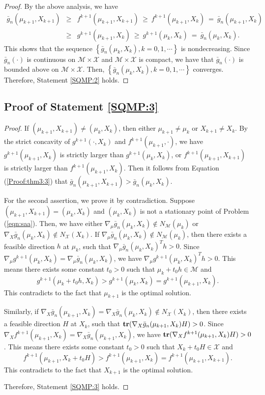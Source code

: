 \begin{proof}
By the above analysis, we have
\begin{eqnarray}\label{Proof:thm3:3}
\bar g_n(\mu_{k+1},X_{k+1}) &\ge& f^{k+1}(\mu_{k+1},X_{k+1})\ \ge\
f^{k+1}(\mu_{k+1},X_{k})\ =\ \bar g_n(\mu_{k+1},X_{k})\nonumber\\
&\ge& g^{k+1}(\mu_{k+1},X_{k})\ \ge\ g^{k+1}(\mu_{k},X_{k})\ =\ \bar
g_n(\mu_{k},X_{k}).
\end{eqnarray}
This shows that the sequence $\left\{\bar
g_n(\mu_k,X_k),k=0,1,\cdots\right\}$ is nondecreasing. Since $\bar
g_n(\cdot)$ is continuous on $\mathcal{M}\times\mathcal{X}$ and
$\mathcal{M}\times\mathcal{X}$ is compact, we have that $\bar
g_n(\cdot)$ is bounded above on $\mathcal{M}\times\mathcal{X}$.
Then, $\left\{\bar g_n(\mu_k,X_k),k=0,1,\cdots\right\}$ converges.
Therefore, Statement \ref{SQMP:2} holds.
\end{proof}


\subsection{Proof of Statement \ref{SQMP:3}}

\begin{proof}
If $(\mu_{k+1},X_{k+1})\not=(\mu_k,X_k)$, then either
$\mu_{k+1}\not=\mu_k$ or $X_{k+1}\not=X_k$. By the strict concavity
of $g^{k+1}(\cdot,X_k)$ and $f^{k+1}(\mu_{k+1},\cdot)$, we have
$g^{k+1}(\mu_{k+1},X_{k})$ is strictly larger than
$g^{k+1}(\mu_k,X_k)$, or $f^{k+1}(\mu_{k+1},X_{k+1})$ is strictly
larger than $f^{k+1}(\mu_{k+1},X_k)$. Then it follows from Equation
(\ref{Proof:thm3:3}) that $\bar g_n(\mu_{k+1},X_{k+1})>\bar
g_n(\mu_k,X_k)$.

For the second assertion, we prove it by contradiction. Suppose
$(\mu_{k+1},X_{k+1})=(\mu_k,X_k)$ and $(\mu_k,X_k)$ is not a
stationary point of Problem (\ref{eqn:saa}). Then, we have either
$\nabla_{\mu} \bar g_n(\mu_k,X_k)\not\in N_{\mathcal{M}}(\mu_k)$ or
$\nabla_{X} \bar g_n(\mu_k,X_k)\not\in N_{\mathcal{X}}(X_k)$. If
$\nabla_{\mu} \bar g_n(\mu_k,X_k)\not\in N_{\mathcal{M}}(\mu_k)$,
then there exists a feasible direction $h$ at $\mu_k$, such that
$\nabla_\mu \bar g_n(\mu_k,X_k)^Th>0$. Since $\nabla_\mu
g^{k+1}(\mu_k,X_k)=\nabla_\mu \bar g_n(\mu_k,X_k)$, we have
$\nabla_\mu g^{k+1}(\mu_k,X_k)^Th>0$. This means there exists some
constant $t_0>0$ such that $\mu_k+t_0h\in \mathcal{M}$ and
\[g^{k+1}(\mu_k+t_0h,X_k)>
g^{k+1}(\mu_k,X_k)=g^{k+1}(\mu_{k+1},X_k).\] This contradicts to the
fact that $\mu_{k+1}$ is the optimal solution.

Similarly, if $\nabla_{X} \bar g_n(\mu_{k+1},X_k)=\nabla_{X} \bar
g_n(\mu_k,X_k)\not\in N_{\mathcal{X}}(X_k)$, then there exists a
feasible direction $H$ at $X_k$, such that ${\bf tr}(\nabla_X \bar
g_n(\mu_{k+1},X_k)H)>0$. Since $\nabla_X
f^{k+1}(\mu_{k+1},X_k)=\nabla_X \bar g_n(\mu_{k+1},X_k)$, we have
${\bf tr}(\nabla_X f^{k+1}(\mu_{k+1},X_k)H)>0$. This means there
exists some constant $t_0>0$ such that $X_k+t_0H\in \mathcal{X}$ and
\[f^{k+1}(\mu_{k+1},X_k+t_0H)>
f^{k+1}(\mu_{k+1},X_k)=f^{k+1}(\mu_{k+1},X_{k+1}).\] This
contradicts to the fact that $X_{k+1}$ is the optimal solution.

Therefore, Statement \ref{SQMP:3} holds.
\end{proof}


